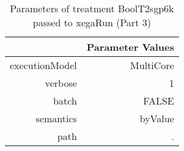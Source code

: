 \begin{table}[ht]
\centering
\begin{tabular}{rr}
  \hline
 & Parameter Values \\ 
  \hline
executionModel & MultiCore \\ 
  verbose & 1 \\ 
  batch & FALSE \\ 
  semantics & byValue \\ 
  path & . \\ 
   \hline
\end{tabular}
\caption{ Parameters of treatment BoolT2sgp6k passed to xegaRun
 (Part 3)} 
\end{table}
